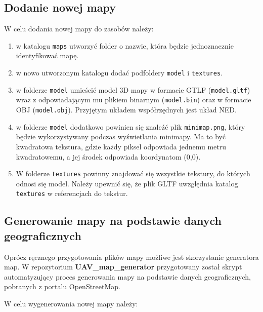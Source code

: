 \subsection{Dodanie nowej mapy} \label{add_map}

 W celu dodania nowej mapy do zasobów należy:
 
 \begin{enumerate}
 	\item w katalogu \texttt{maps} utworzyć folder o nazwie, która będzie jednoznacznie identyfikować mapę.
 	\item w nowo utworzonym katalogu dodać podfoldery \texttt{model} i \texttt{textures}.
 	\item w folderze \texttt{model} umieścić model 3D mapy w formacie GTLF (\texttt{model.gltf}) wraz z odpowiadającym mu plikiem binarnym (\texttt{model.bin}) oraz w formacie OBJ (\texttt{model.obj}). Przyjętym układem współrzędnych jest układ NED.
 	\item w folderze \texttt{model} dodatkowo powinien się znaleźć plik \texttt{minimap.png}, który będzie wykorzystywany podczas wyświetlania minimapy. Ma to być kwadratowa tekstura, gdzie każdy piksel odpowiada jednemu metru kwadratowemu, a jej środek odpowiada koordynatom (0,0).
 	\item W folderze \texttt{textures} powinny znajdować się wszystkie tekstury, do których odnosi się model. Należy upewnić się, że plik GLTF uwzględnia katalog \texttt{textures} w referencjach do tekstur.
 \end{enumerate}
 
\subsection{Generowanie mapy na podstawie danych geograficznych}

Oprócz ręcznego przygotowania plików mapy możliwe jest skorzystanie generatora map. W repozytorium \textbf{UAV\_map\_generator} przygotowany został skrypt automatyzujący proces generowania mapy na podstawie danych geograficznych, pobranych z portalu OpenStreetMap.

W celu wygenerowania nowej mapy należy:

